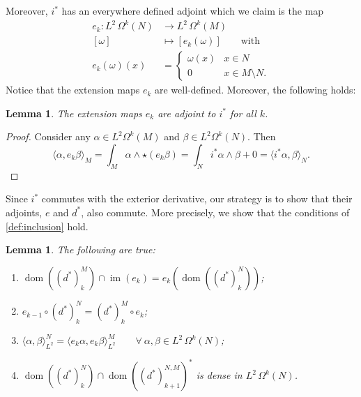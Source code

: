 \documentclass[11pt]{article}
\newtheorem{lemma}[theorem]{Lemma}
\theoremstyle{definition}
\theoremstyle{remark}
\DeclareMathOperator\dom{dom}
\DeclareMathOperator{\im}{im}
\begin{document}
Moreover, $i^*$ has an everywhere defined adjoint which we claim is the map
\begin{align*}
    e_k: L^2 \, \Omega^k(N) &\rightarrow L^2 \, \Omega^k(M)\\
    [\omega] &\mapsto [e_k (\omega)] \qquad \text{with}\\
    e_k(\omega) (x)&=\begin{cases}
        \omega (x) & x \in N\\
        0 & x \in M \setminus N.
    \end{cases}
\end{align*}
Notice that the extension maps $e_k$ are well-defined. Moreover, the following holds:
\begin{lemma}
    The extension maps $e_k$ are adjoint to $i^*$ for all $k$.
\end{lemma}
\begin{proof}
    Consider any $\alpha \in L^2 \Omega^k(M)$ and $\beta \in L^2 \Omega^k(N)$. Then
    $$
        \langle \alpha, e_k \beta \rangle_M = \int_M \alpha \wedge \star (e_k \beta) = \int_N i^*\alpha \wedge \beta + 0 = \langle i^* \alpha, \beta \rangle_N.
    $$
\end{proof}

Since $i^*$ commutes with the exterior derivative, our strategy is to show that their adjoints, $e$ and $d^*$, also commute. More precisely, we show that the conditions of \cref{def:inclusion} hold.

\begin{lemma} \label{lem:derhamispair}
The following are true:
    \begin{enumerate}
        \item[(a)] $\dom((d^*)_k^M)\cap \im(e_k)=e_k(\dom((d^*)_k^N))$;
        \item[(b)] $e_{k-1} \circ (d^*)_k^N=(d^*)_k^M \circ e_k$;
        \item[(c)] $\langle \alpha, \beta \rangle^N_{L^2}=\langle e_k \alpha ,e_k \beta \rangle^M_{L^2} \qquad \forall\  \alpha, \beta \in L^2 \, \Omega^k(N)$;
        \item[(d)] $\dom((d^*)_k^N) \cap \dom((d^*)_{k+1}^{N,M})^*$ is dense in $L^2 \, \Omega^k(N)$.
    \end{enumerate}
\end{lemma}
\end{document}
